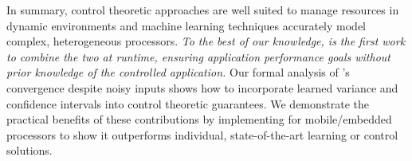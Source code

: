 In summary, control theoretic approaches are well suited to manage
resources in dynamic environments and machine learning techniques
accurately model complex, heterogeneous processors.  \emph{To the best
  of our knowledge, \SYSTEM{} is the first work to combine the two at
  runtime, ensuring application performance goals without prior
  knowledge of the controlled application.}  Our formal analysis of
\SYSTEM{}'s convergence despite noisy inputs shows how to incorporate
learned variance and confidence intervals into control theoretic
guarantees.  We demonstrate the practical benefits of these
contributions by implementing \SYSTEM{} for mobile/embedded processors
to show it outperforms individual, state-of-the-art learning or
control solutions.


